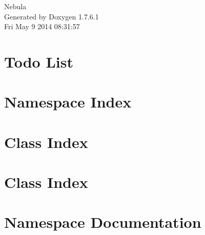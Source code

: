\documentclass[a4paper]{book}
\begin{document}
\hypersetup{pageanchor=false,citecolor=blue}
\begin{titlepage}
\vspace*{7cm}
\begin{center}
{\Large \-Nebula }\\
\vspace*{1cm}
{\large \-Generated by Doxygen 1.7.6.1}\\
\vspace*{0.5cm}
{\small Fri May 9 2014 08:31:57}\\
\end{center}
\end{titlepage}
\clearemptydoublepage
{}
\tableofcontents
\clearemptydoublepage
{}
\hypersetup{pageanchor=true,citecolor=blue}
\chapter{\-Todo \-List}
\label{todo}
\hypertarget{todo}{}

\chapter{\-Namespace \-Index}

\chapter{\-Class \-Index}

\chapter{\-Class \-Index}

\chapter{\-Namespace \-Documentation}

















\end{document}
